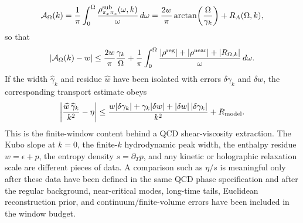 \begin{controlledapproximation}
\begin{equation}
  \mathcal A_\Omega(k)
  =
  \frac1\pi\int_0^\Omega
  \frac{\rho^{\rm sub}_{\pi_x\pi_x}(\omega,k)}{\omega}\,d\omega
  =
  \frac{2w}{\pi}\arctan\!\left(\frac{\Omega}{\gamma_k}\right)
  +
  R_A(\Omega,k),
  \label{eq:qcd-shear-spectral-window-area}
\end{equation}
so that
\begin{equation}
  \left|\mathcal A_\Omega(k)-w\right|
  \le
  \frac{2w}{\pi}\frac{\gamma_k}{\Omega}
  +
  \frac1\pi\int_0^\Omega
  \frac{|\rho^{\rm reg}|+|\rho^{\rm near}|+|R_{\Omega,k}|}{\omega}\,d\omega .
  \label{eq:qcd-shear-window-residue-bound}
\end{equation}
If the width \(\widehat\gamma_k\) and residue \(\widehat w\) have been
isolated with errors \(\delta\gamma_k\) and \(\delta w\), the corresponding
transport estimate obeys
\begin{equation}
  \left|
  \frac{\widehat w\,\widehat\gamma_k}{k^2}-\eta
  \right|
  \le
  \frac{
    w|\delta\gamma_k|
    +
    \gamma_k|\delta w|
    +
    |\delta w|\,|\delta\gamma_k|
  }{k^2}
  +
  R_{\rm model}.
  \label{eq:qcd-shear-window-eta-error-budget}
\end{equation}
This is the finite-window content behind a QCD shear-viscosity extraction.  The
Kubo slope at \(k=0\), the finite-\(k\) hydrodynamic peak width, the enthalpy
residue \(w=\epsilon+p\), the entropy density \(s=\partial_Tp\), and any
kinetic or holographic relaxation scale are different pieces of data.  A
comparison such as \(\eta/s\) is meaningful only after these data have been
defined in the same QCD phase specification and after the regular background,
near-critical modes, long-time tails, Euclidean reconstruction prior, and
continuum/finite-volume errors have been included in the window budget.
\end{controlledapproximation}

